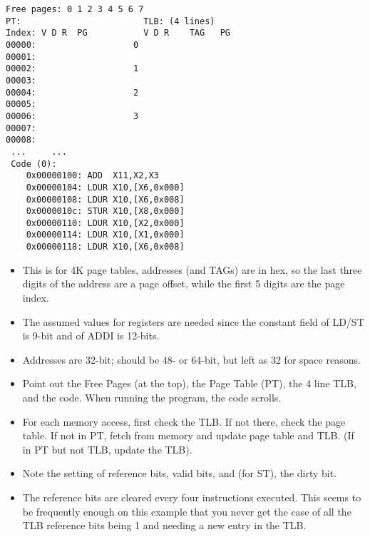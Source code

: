 \begin{frame}[fragile]
\ifnum{}
\else
\newpage
\fi
\scriptsize
\begin{verbatim}
Free pages: 0 1 2 3 4 5 6 7
PT:                        TLB: (4 lines)
Index: V D R  PG           V D R    TAG   PG
00000:                   0 
00001:                     
00002:                   1 
00003:                     
00004:                   2 
00005:                     
00006:                   3 
00007:                     
00008:                     
 ...     ...
 Code (0):
    0x00000100: ADD  X11,X2,X3
    0x00000104: LDUR X10,[X6,0x000]
    0x00000108: LDUR X10,[X6,0x008]
    0x0000010c: STUR X10,[X8,0x000]
    0x00000110: LDUR X10,[X2,0x000]
    0x00000114: LDUR X10,[X1,0x000]
    0x00000118: LDUR X10,[X6,0x008]
\end{verbatim}
\BNotes\ifnum{}
\begin{itemize}
\item This is for 4K page tables, addresses (and TAGs) are in hex, so the
	last three digits of the address are a page offset, while the first 5
	digits are the page index.
\item The assumed values for registers are needed since the constant field
	of LD/ST is 9-bit and of ADDI is 12-bits.
\item Addresses are 32-bit; should be 48- or 64-bit, but left as 32 for space
	reasons.
\item Point out the Free Pages (at the top), the Page Table (PT), the 4 line TLB, and the code.  When running the program, the code scrolls.
\item For each memory access, first check the TLB.  If not there, check the page table.  If not in PT, fetch from memory and update page table and TLB.  (If in PT but not TLB, update the TLB).  
\item Note the setting of reference bits, valid bits, and (for ST), the dirty bit.
\item The reference bits are cleared every four instructions executed.  This seems to be frequently enough on this example that you never get the case of all the TLB reference bits being 1 and needing a new entry in the TLB.
\end{itemize}
\fi\ENotes

\end{frame}

